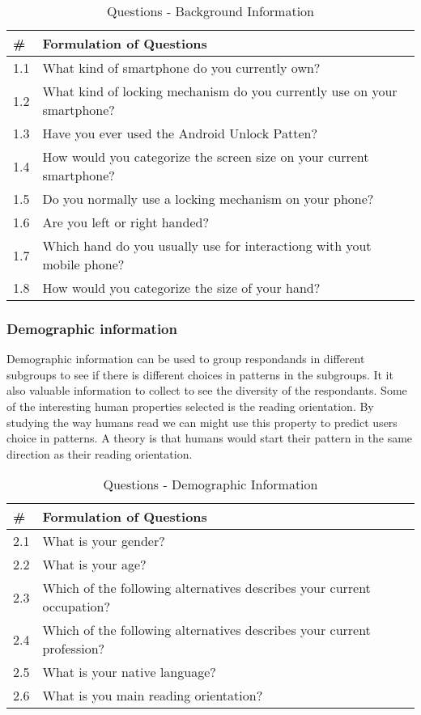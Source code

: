     \begin{table}[H]
      \begin{tabular}{| p{1cm} | p{10cm} |}
          \hline
          {\bf \#} & {\bf Formulation of Questions} \\ \hline
          1.1 & What kind of smartphone do you currently own? \\ \hline
          1.2 & What kind of locking mechanism do you currently use on your smartphone? \\ \hline
          1.3 & Have you ever used the Android Unlock Patten? \\ \hline
          1.4 & How would you categorize the screen size on your current smartphone? \\ \hline
          1.5 & Do you normally use a locking mechanism on your phone? \\ \hline
          1.6 & Are you left or right handed? \\ \hline
          1.7 & Which hand do you usually use for interactiong with yout mobile phone? \\ \hline
          1.8 & How would you categorize the size of your hand? \\ \hline
      \end{tabular}
      \caption{Questions - Background Information}
    \end{table}

    \subsubsection*{Demographic information}
    Demographic information can be used to group respondands in different subgroups to see if there is different choices in patterns in the subgroups. It it also valuable information to collect to see the diversity of the respondants. Some of the interesting human properties selected is the reading orientation. By studying the way humans read we can might use this property to predict users choice in patterns. A theory is that humans would start their pattern in the same direction as their reading orientation. 

    \begin{table}[H]
      \begin{tabular}{| p{1cm} | p{10cm} |}
        \hline
        {\bf \#} & {\bf Formulation of Questions} \\ \hline
        2.1 & What is your gender? \\ \hline
        2.2 & What is your age? \\ \hline
        2.3 & Which of the following alternatives describes your current occupation? \\ \hline
        2.4 & Which of the following alternatives describes your current profession? \\ \hline
        2.5 & {\color{red} What is your native language?} \\ \hline 
        2.6 & What is you main reading orientation? \\ \hline
      \end{tabular}
      \caption{Questions - Demographic Information}
    \end{table}

